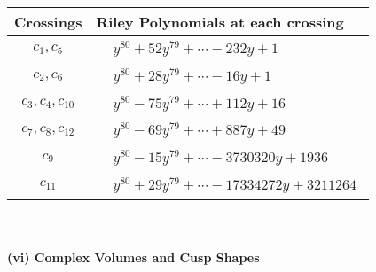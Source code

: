 \documentclass[1p]{elsarticle_modified}
\theoremstyle{definition}
\begin{document}
\begin{tabular}{m{50pt}|m{274pt}}
Crossings & \hspace{64pt}Riley Polynomials at each crossing \\
\hline $$\begin{aligned}c_{1},c_{5}\end{aligned}$$&$\begin{aligned}
&y^{80}+52 y^{79}+\cdots-232 y+1
\end{aligned}$\\
\hline $$\begin{aligned}c_{2},c_{6}\end{aligned}$$&$\begin{aligned}
&y^{80}+28 y^{79}+\cdots-16 y+1
\end{aligned}$\\
\hline $$\begin{aligned}c_{3},c_{4},c_{10}\end{aligned}$$&$\begin{aligned}
&y^{80}-75 y^{79}+\cdots+112 y+16
\end{aligned}$\\
\hline $$\begin{aligned}c_{7},c_{8},c_{12}\end{aligned}$$&$\begin{aligned}
&y^{80}-69 y^{79}+\cdots+887 y+49
\end{aligned}$\\
\hline $$\begin{aligned}c_{9}\end{aligned}$$&$\begin{aligned}
&y^{80}-15 y^{79}+\cdots-3730320 y+1936
\end{aligned}$\\
\hline $$\begin{aligned}c_{11}\end{aligned}$$&$\begin{aligned}
&y^{80}+29 y^{79}+\cdots-17334272 y+3211264
\end{aligned}$\\
\hline
\end{tabular}\\~\\
\newpage\flushleft \textbf{(vi) Complex Volumes and Cusp Shapes}
\end{document}
